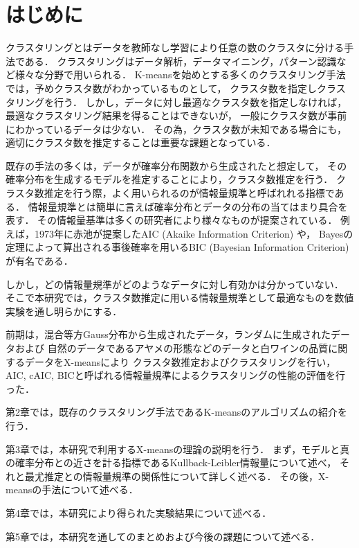 \section{はじめに}
クラスタリングとはデータを教師なし学習により任意の数のクラスタに分ける手法である．
クラスタリングはデータ解析，データマイニング，パターン認識など様々な分野で用いられる．
K-meansを始めとする多くのクラスタリング手法では，予めクラスタ数がわかっているものとして，
クラスタ数を指定しクラスタリングを行う．
しかし，データに対し最適なクラスタ数を指定しなければ，最適なクラスタリング結果を得ることはできないが，
一般にクラスタ数が事前にわかっているデータは少ない．
その為，クラスタ数が未知である場合にも，適切にクラスタ数を推定することは重要な課題となっている．

既存の手法の多くは，データが確率分布関数から生成されたと想定して，
その確率分布を生成するモデルを推定することにより，クラスタ数推定を行う．
クラスタ数推定を行う際，よく用いられるのが情報量規準と呼ばれれる指標である．
情報量規準とは簡単に言えば確率分布とデータの分布の当てはまり具合を表す．
その情報量基準は多くの研究者により様々なものが提案されている．
例えば，1973年に赤池が提案したAIC (Akaike Information Criterion) や，
Bayesの定理によって算出される事後確率を用いるBIC (Bayesian Information Criterion)が有名である．

しかし，どの情報量規準がどのようなデータに対し有効かは分かっていない．
そこで本研究では，クラスタ数推定に用いる情報量規準として最適なものを数値実験を通し明らかにする．

前期は，混合等方Gauss分布から生成されたデータ，ランダムに生成されたデータおよび
自然のデータであるアヤメの形態などのデータと白ワインの品質に関するデータをX-meansにより
クラスタ数推定およびクラスタリングを行い，AIC, cAIC, BICと呼ばれる情報量規準によるクラスタリングの性能の評価を行った．

第2章では，既存のクラスタリング手法であるK-meansのアルゴリズムの紹介を行う．

第3章では，本研究で利用するX-meansの理論の説明を行う．
まず，モデルと真の確率分布との近さを計る指標であるKullback-Leibler情報量について述べ，
それと最尤推定との情報量規準の関係性について詳しく述べる．
その後，X-meansの手法について述べる．

第4章では，本研究により得られた実験結果について述べる．

第5章では，本研究を通してのまとめおよび今後の課題について述べる．

